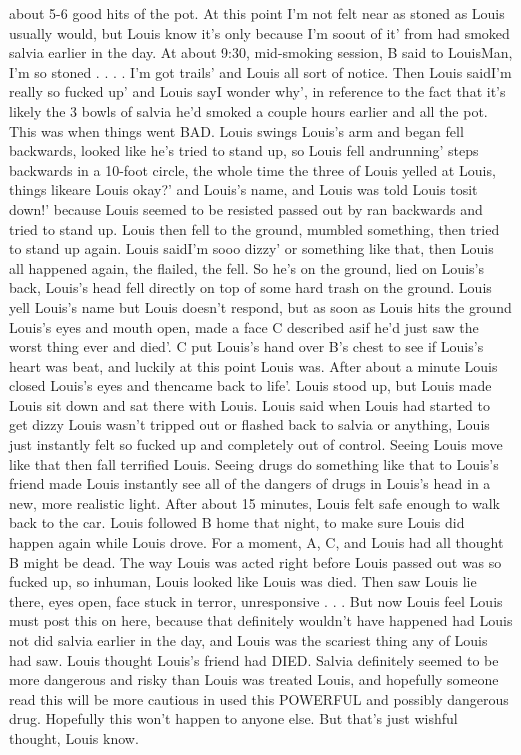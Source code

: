 \documentclass[12pt]{book}
\begin{document}
about 5-6 good hits of the pot. At this point I'm not felt near as stoned as Louis usually would, but Louis know it's only because I'm soout of it' from had smoked salvia earlier in the day. At about 9:30, mid-smoking session, B said to LouisMan, I'm so stoned . . .  . I'm got trails' and Louis all sort of notice. Then Louis saidI'm really so fucked up' and Louis sayI wonder why', in reference to the fact that it's likely the 3 bowls of salvia he'd smoked a couple hours earlier and all the pot. This was when things went BAD. Louis swings Louis's arm and began fell backwards, looked like he's tried to stand up, so Louis fell andrunning' steps backwards in a 10-foot circle, the whole time the three of Louis yelled at Louis, things likeare Louis okay?' and Louis's name, and Louis was told Louis tosit down!' because Louis seemed to be resisted passed out by ran backwards and tried to stand up. Louis then fell to the ground, mumbled something, then tried to stand up again. Louis saidI'm sooo dizzy' or something like that, then Louis all happened again, the flailed, the fell. So he's on the ground, lied on Louis's back, Louis's head fell directly on top of some hard trash on the ground. Louis yell Louis's name but Louis doesn't respond, but as soon as Louis hits the ground Louis's eyes and mouth open, made a face C described asif he'd just saw the worst thing ever and died'. C put Louis's hand over B's chest to see if Louis's heart was beat, and luckily at this point Louis was. After about a minute Louis closed Louis's eyes and thencame back to life'. Louis stood up, but Louis made Louis sit down and sat there with Louis. Louis said when Louis had started to get dizzy Louis wasn't tripped out or flashed back to salvia or anything, Louis just instantly felt so fucked up and completely out of control. Seeing Louis move like that then fall terrified Louis. Seeing drugs do something like that to Louis's friend made Louis instantly see all of the dangers of drugs in Louis's head in a new, more realistic light. After about 15 minutes, Louis felt safe enough to walk back to the car. Louis followed B home that night, to make sure Louis did happen again while Louis drove. For a moment, A, C, and Louis had all thought B might be dead. The way Louis was acted right before Louis passed out was so fucked up, so inhuman, Louis looked like Louis was died. Then saw Louis lie there, eyes open, face stuck in terror, unresponsive . . .  But now Louis feel Louis must post this on here, because that definitely wouldn't have happened had Louis not did salvia earlier in the day, and Louis was the scariest thing any of Louis had saw. Louis thought Louis's friend had DIED. Salvia definitely seemed to be more dangerous and risky than Louis was treated Louis, and hopefully someone read this will be more cautious in used this POWERFUL and possibly dangerous drug. Hopefully this won't happen to anyone else. But that's just wishful thought, Louis know.
\end{document}
